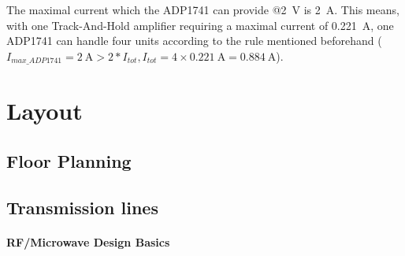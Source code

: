 The maximal current which the ADP1741 can provide @\SI{2}{\volt} is \SI{2}{\ampere}. This means, with one Track-And-Hold amplifier requiring a maximal current of \SI{0.221}{\ampere}, one ADP1741 can handle four units according to the rule mentioned beforehand ($I_{max\_ADP1741} = \SI{2}{\ampere} > 2 * I_{tot}, I_{tot} = 4 \times \SI{0.221}{\ampere} =  \SI{0.884}{\ampere}$).



\section{Layout}

\subsection{Floor Planning}
\subsection{Transmission lines}
\paragraph{RF/Microwave Design Basics}

